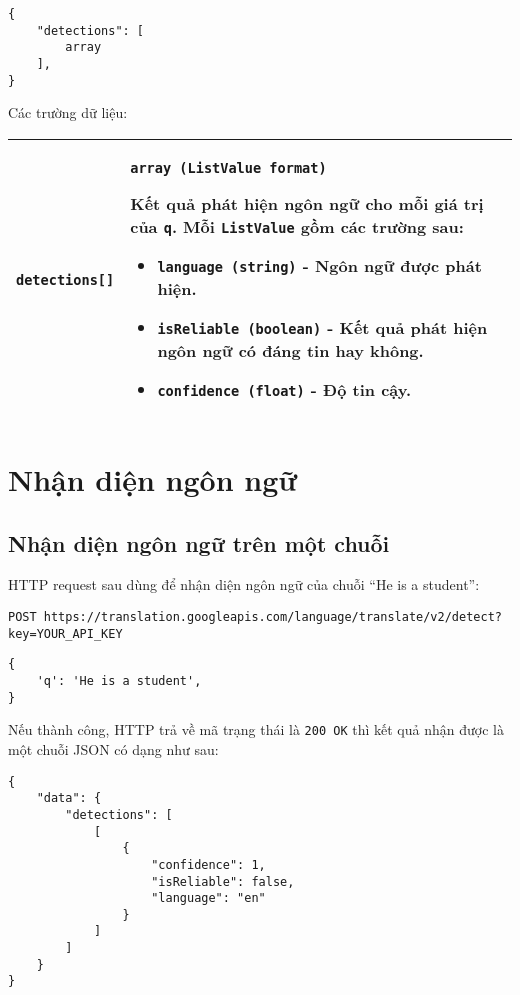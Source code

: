 \documentclass[../thesis.tex]{subfiles}
\begin{document}
\begin{lstlisting}[style=link]
{
	"detections": [
		array
	],
}
\end{lstlisting}

Các trường dữ liệu:
\begin{center}
\begin{tabularx}{\textwidth}{|p{}|X|}
\hline
\lstinline{detections[]} & \lstinline{array (ListValue format)}

Kết quả phát hiện ngôn ngữ cho mỗi giá trị của \lstinline{q}. Mỗi \lstinline{ListValue} gồm các trường sau:

\begin{itemize}
  \item \lstinline{language (string)} - Ngôn ngữ được phát hiện.
  \item \lstinline{isReliable (boolean)} - Kết quả phát hiện ngôn ngữ có đáng tin hay không.
  \item \lstinline{confidence (float)} - Độ tin cậy.
\end{itemize}
\\
\hline
\end{tabularx}
\end{center}

\section{Nhận diện ngôn ngữ}
\subsection{Nhận diện ngôn ngữ trên một chuỗi}
HTTP request sau dùng để nhận diện ngôn ngữ của chuỗi ``He is a student'':
\begin{lstlisting}[style=link]
POST https://translation.googleapis.com/language/translate/v2/detect?key=YOUR_API_KEY
\end{lstlisting}
\begin{lstlisting}[style=link]
{
	'q': 'He is a student',
}
\end{lstlisting}

Nếu thành công, HTTP trả về mã trạng thái là \lstinline{200 OK} thì kết quả nhận được là một chuỗi JSON có dạng như sau:

\begin{lstlisting}[style=link]
{
	"data": {
		"detections": [
			[
				{
					"confidence": 1,
					"isReliable": false,
					"language": "en"
				}
			]
		]
	}
}
\end{lstlisting}
\end{document}
